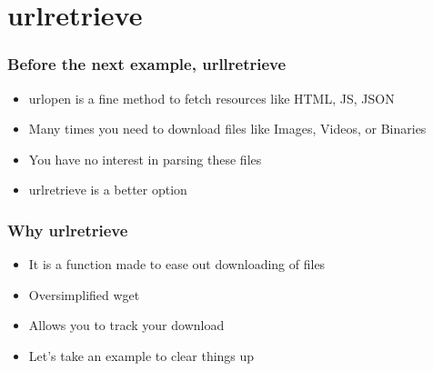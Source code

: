 \documentclass{beamer}
\begin{document}
\section{urlretrieve}
\label{sec-6}
\begin{frame}
\frametitle{Before the next example, urllretrieve}
\label{sec-6_1}


\begin{itemize}
\item urlopen is a fine method to fetch resources like HTML, JS, JSON
\item Many times you need to download files like Images, Videos, or Binaries
\item You have no interest in parsing these files
\item urlretrieve is a better option
\end{itemize}
\end{frame}
\begin{frame}
\frametitle{Why urlretrieve}
\label{sec-6_2}


\begin{itemize}
\item It is a function made to ease out downloading of files
\item Oversimplified wget
\item Allows you to track your download
\item Let's take an example to clear things up
\end{itemize}
\end{frame}
\end{document}
